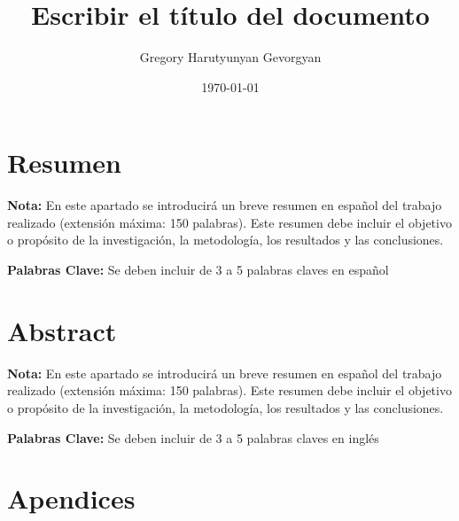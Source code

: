 \documentclass[11pt,a4paper,spanish]{book}
\title{Escribir el título del documento}
\author{Gregory Harutyunyan Gevorgyan}
\date{\today}
\numberwithin{equation}{chapter}
\numberwithin{figure}{chapter}
\begin{document}
\renewcommand{\listfigurename}{Índice de Ilustraciones}
\renewcommand{\listtablename}{Índice de Tablas}
\renewcommand{\contentsname}{Índice de Contenidos}
\renewcommand{\figurename}{Figura}
\renewcommand{\tablename}{Tabla} 

\maketitle
 
\frontmatter
\tableofcontents
\listoffigures
\listoftables

\chapter{Resumen}
{\bf Nota:} En este apartado se introducirá un breve resumen en español del trabajo realizado (extensión máxima: 150 palabras). Este resumen debe incluir el objetivo o propósito de la investigación, la metodología, los resultados y las conclusiones.


{\bf Palabras Clave:} Se deben incluir de 3 a 5 palabras claves en español

\chapter{Abstract}
{\bf Nota:} En este apartado se introducirá un breve resumen en español del trabajo realizado (extensión máxima: 150 palabras). Este resumen debe incluir el objetivo o propósito de la investigación, la metodología, los resultados y las conclusiones.


{\bf Palabras Clave:} Se deben incluir de 3 a 5 palabras claves en inglés




\mainmatter








\nocite{*}



\appendix
\chapter{Apendices}
\end{document}
